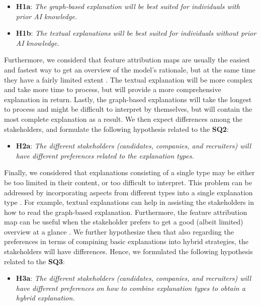 \begin{itemize}
    \item \textbf{H1a}: \textit{The graph-based explanation will be best suited for individuals with prior AI knowledge.}
    \item \textbf{H1b}: \textit{The textual explanations will be best suited for individuals without prior AI knowledge.}    
\end{itemize}

Furthermore, we considerd that feature attribution maps are usually the easiest and fastest way to get an overview of the model's rationale, but at the same time they have a fairly limited extent \cite{szymanski2021visual}. The textual explanation will be more complex and take more time to process, but will provide a more comprehensive explanation in return. Lastly, the graph-based explanations will take the longest to process and might be difficult to interpret by themselves, but will contain the most complete explanation as a result. We then expect differences among the stakeholders, and formulate the following hypothesis related to the \textbf{SQ2}:

\begin{itemize}
    \item \textbf{H2a}: \textit{The different stakeholders (candidates, companies, and recruiters) will have different preferences related to the explanation types.}   
\end{itemize}

Finally, we considered that explanations consisting of a single type may be either be too limited in their content, or too difficult to interpret. This problem can be addressed by incorporating aspects from different types into a single explanation type \cite{szymanski2021visual}. For example, textual explanations can help in assisting the stakeholders in how to read the graph-based explanation. Furthermore, the feature attribution map can be useful when the stakeholder prefers to get a good (albeit limited) overview at a glance \cite{schellingerhout2022explainable}. We further hypothesize then that also regarding the preferences in terms of compining basic explanations into hybrid strategies, the stakeholders will have differences. Hence, we formulated the following hypothesis related to the \textbf{SQ3}:

\begin{itemize}
    \item \textbf{H3a}: \textit{The different stakeholders (candidates, companies, and recruiters) will have different preferences on how to combine explanation types to obtain a hybrid explanation.}

\end{itemize}


